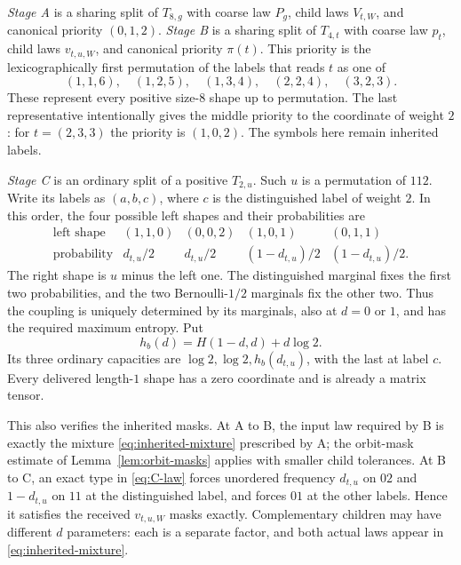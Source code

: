 \emph{Stage A} is a sharing split of $T_{8,g}$ with coarse law $P_g$,
child laws $V_{t,W}$, and canonical priority $(0,1,2)$.
\emph{Stage B} is a sharing split of $T_{4,t}$ with coarse law $p_t$,
child laws $v_{t,u,W}$, and canonical priority $\pi(t)$.  This priority
is the lexicographically first permutation of the labels that reads
$t$ as one of
\begin{equation}\label{eq:B-priority}
 (1,1,6),\quad(1,2,5),\quad(1,3,4),\quad(2,2,4),\quad(3,2,3).
\end{equation}
These represent every positive size-$8$ shape up to permutation.
The last representative intentionally gives the middle priority to
the coordinate of weight $2$: for $t=(2,3,3)$ the priority is
$(1,0,2)$.  The symbols here remain inherited labels.

\emph{Stage C} is an ordinary split of a positive $T_{2,u}$.
Such $u$ is a permutation of $112$.  Write its labels as $(a,b,c)$,
where $c$ is the distinguished label of weight $2$.  In this order,
the four possible left shapes and their probabilities are
\begin{equation}\label{eq:C-law}
\begin{array}{c|cccc}
 \text{left shape}&(1,1,0)&(0,0,2)&(1,0,1)&(0,1,1)\\ \hline
 \text{probability}&d_{t,u}/2&d_{t,u}/2&(1-d_{t,u})/2&(1-d_{t,u})/2.
\end{array}
\end{equation}
The right shape is $u$ minus the left one.  The distinguished marginal
fixes the first two probabilities, and the two Bernoulli-$1/2$
marginals fix the other two.  Thus the coupling is uniquely determined
by its marginals, also at $d=0$ or $1$, and has the required maximum
entropy.  Put
\[
 h_b(d)=H(1-d,d)+d\log2.
\]
Its three ordinary capacities are $\log2,\log2,h_b(d_{t,u})$, with the
last at label $c$.  Every delivered length-$1$ shape has a zero
coordinate and is already a matrix tensor.

This also verifies the inherited masks.  At A to B, the input law
required by B is exactly the mixture \eqref{eq:inherited-mixture}
prescribed by A; the orbit-mask estimate of
Lemma~\ref{lem:orbit-masks} applies with smaller child tolerances.
At B to C, an exact type in \eqref{eq:C-law} forces unordered frequency
$d_{t,u}$ on $02$ and $1-d_{t,u}$ on $11$ at the distinguished label,
and forces $01$ at the other labels.  Hence it satisfies the received
$v_{t,u,W}$ masks exactly.  Complementary children may have different
$d$ parameters: each is a separate factor, and both actual laws appear
in \eqref{eq:inherited-mixture}.

